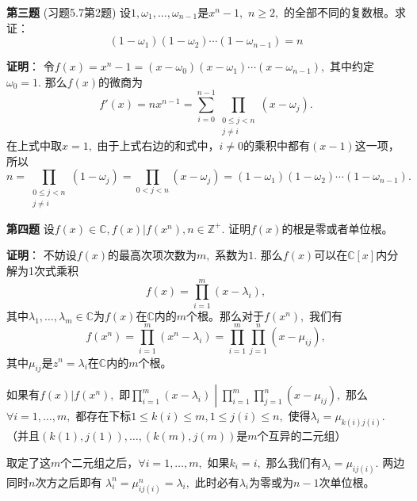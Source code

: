 \fi  %

\newpageorvspace

{\bf 第三题} (习题5.7第2题) 设$1, \omega_1, \ldots, \omega_{n-1}$是$x^n - 1,$ $n \geqslant 2,$ 的全部不同的复数根。求证：
$$(1 - \omega_1)(1 - \omega_2) \cdots (1 - \omega_{n-1}) = n$$

\ifIncludeAnswer

\newpageorvspace

{\bf 证明}： 令$f(x) = x^n - 1 = (x - \omega_0)(x - \omega_1) \cdots (x - \omega_{n-1}),$ 其中约定$\omega_0 = 1.$ 那么$f(x)$的微商为
$$f'(x) = nx^{n-1} = \sum\limits_{i=0}^{n-1} \prod\limits_{\substack{0 \leqslant j < n \\ j \neq i}} (x - \omega_j).$$
在上式中取$x = 1,$ 由于上式右边的和式中，$i \neq 0$的乘积中都有$(x - 1)$这一项，所以
$$n = \prod\limits_{\substack{0 \leqslant j < n \\ j \neq i}} (1 - \omega_j) = \prod\limits_{0 < j < n } (x - \omega_j) = (1 - \omega_1)(1 - \omega_2) \cdots (1 - \omega_{n-1}).$$

\fi  %

\newpageorvspace

{\bf 第四题} 设$f(x) \in \mathbb{C}, f(x) | f(x^n), n \in \mathbb{Z}^+.$ 证明$f(x)$的根是零或者单位根。

\ifIncludeAnswer

\newpageorvspace

{\bf 证明}： 不妨设$f(x)$的最高次项次数为$m,$ 系数为$1.$ 那么$f(x)$可以在$\mathbb{C}[x]$内分解为1次式乘积
$$f(x) = \prod\limits_{i=1}^m (x - \lambda_i),$$
其中$\lambda_1, \ldots, \lambda_m \in \mathbb{C}$为$f(x)$在$\mathbb{C}$内的$m$个根。那么对于$f(x^n),$ 我们有
$$f(x^n) = \prod\limits_{i=1}^m (x^n - \lambda_i) = \prod\limits_{i=1}^m \prod\limits_{j=1}^n (x - \mu_{ij}),$$
其中$\mu_{ij}$是$z^n = \lambda_i$在$\mathbb{C}$内的$m$个根。

如果有$f(x) | f(x^n),$ 即$\left.\prod\limits_{i=1}^m (x - \lambda_i) \middle| \prod\limits_{i=1}^m \prod\limits_{j=1}^n (x - \mu_{ij}) \right.,$ 那么$\forall i = 1, \ldots, m,$ 都存在下标$1 \leqslant k(i) \leqslant m, 1 \leqslant j(i) \leqslant n,$ 使得$\lambda_i = \mu_{k(i)j(i)}.$ （并且$(k(1), j(1)), \ldots, (k(m), j(m))$是$m$个互异的二元组）

取定了这$m$个二元组之后，$\forall i = 1, \ldots, m,$ 如果$k_i = i,$ 那么我们有$\lambda_i = \mu_{ij(i)}.$ 两边同时$n$次方之后即有
$\lambda_i^n = \mu_{ij(i)}^n = \lambda_i,$ 此时必有$\lambda_i$为零或为$n - 1$次单位根。

